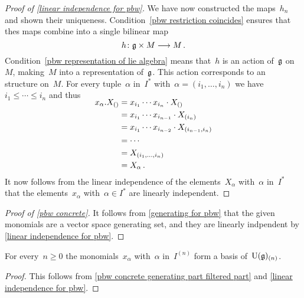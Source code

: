 \begin{proof}[Proof of \cref{linear independence for pbw}]
	We have now constructed the maps~$h_n$ and shown their uniqueness. 
	Condition~\ref{pbw restriction coincides} ensures that thes maps combine into a single bilinear map
	\[
		h
		\colon
		\glie \times M
		\to
		M \,.
	\]
	Condition~\ref{pbw representation of lie algebra} means that~$h$ is an action of~$\mathfrak{g}$ on~$M$, making~$M$ into a representation of~$\mathfrak{g}$.
	This action corresponds to an~\module{$\Univ(\glie)$} structure on~$M$.
	For every tuple~$\alpha$ in~$I^*$ with~$\alpha = (i_1, \dotsc, i_n)$ we have~$i_1 \leq \dotsb \leq i_n$ and thus
	\begin{align*}
		\SwapAboveDisplaySkip
		x_\alpha . X_{()}
		&=
		x_{i_1} \dotsm x_{i_n} \cdot X_{()}
		\\
		&=
		x_{i_1} \dotsm x_{i_{n-1}} \cdot X_{(i_n)}
		\\
		&=
		x_{i_1} \dotsm x_{i_{n-2}} \cdot X_{(i_{n-1}, i_n)}
		\\
		&=
		\dotsb
		\\
		&=
		X_{(i_1, \dotsc, i_n)}
		\\
		&=
		X_\alpha \,.
	\end{align*}
	It now follows from the linear independence of the elements~$X_\alpha$ with~$\alpha$ in~$I^*$ that the elements~$x_\alpha$ with~$\alpha \in I^*$ are linearly independent.
\end{proof}


\begin{proof}[Proof of \cref{pbw concrete}]
	It follows from \cref{generating for pbw} that the given monomials are a vector space generating set, and they are linearly indpendent by \cref{linear independence for pbw}.
\end{proof}


\begin{corollary}
	\label{pbw concrete basis part filtered part}
	For every~$n \geq 0$ the monomials~$x_\alpha$ with~$\alpha$ in~$I^{(n)}$ form a basis of~$\operatorname{U}(\mathfrak{g})_{(n)}$.
\end{corollary}


\begin{proof}
	This follows from \cref{pbw concrete generating part filtered part} and \cref{linear independence for pbw}.
\end{proof}


